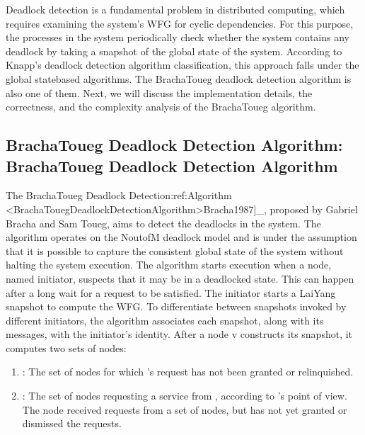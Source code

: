 \documentclass[letterpaper,10pt,english]{sphinxmanual}
\begin{document}
\sphinxAtStartPar
Deadlock detection is a fundamental problem in distributed computing, which requires examining the system’s WFG for cyclic dependencies. For this purpose, the processes in the system periodically check whether the system contains any deadlock by taking a snapshot of the global state of the system. According to Knapp’s deadlock detection algorithm classification, this approach falls under the global state\sphinxhyphen{}based algorithms. The Bracha\sphinxhyphen{}Toueg deadlock detection algorithm is also one of them. Next, we will discuss the implementation details, the correctness, and the complexity analysis of the Bracha\sphinxhyphen{}Toueg algorithm.


\subsection{Bracha\sphinxhyphen{}Toueg Deadlock Detection Algorithm: Bracha\sphinxhyphen{}Toueg Deadlock Detection Algorithm}
\label{\detokenize{docs/BrachaTouegAlg/algorithm:bracha-toueg-deadlock-detection-algorithm-brachatouegalg}}
\sphinxAtStartPar
The Bracha\sphinxhyphen{}Toueg Deadlock Detection:ref:{\color{red}\bfseries{}\textasciigrave{}}Algorithm \textless{}BrachaTouegDeadlockDetectionAlgorithm\textgreater{}\textasciigrave{}{[}Bracha1987{]}\_, proposed by Gabriel Bracha and Sam Toueg, aims to detect the deadlocks in the system. The algorithm operates on the N\sphinxhyphen{}out\sphinxhyphen{}of\sphinxhyphen{}M deadlock model and is under the assumption that it is possible to capture the consistent global state of the system without halting the system execution. The algorithm starts execution when a node, named initiator, suspects that it may be in a deadlocked state. This can happen after a long wait for a request to be satisfied. The initiator starts a Lai\sphinxhyphen{}Yang snapshot to compute the WFG. To differentiate between snapshots invoked by different initiators, the algorithm associates each snapshot, along with its messages, with the initiator’s identity. After a node v constructs its snapshot, it computes two sets of nodes:
\begin{enumerate}
%
\item {} 
\sphinxAtStartPar
{}: The set of nodes  for which ’s request has not been granted or relinquished.

\item {} 
\sphinxAtStartPar
{}: The set of nodes requesting a service from , according to ’s point of view. The node  received requests from a set of nodes, but  has not yet granted or dismissed the requests.

\end{enumerate}
\end{document}
